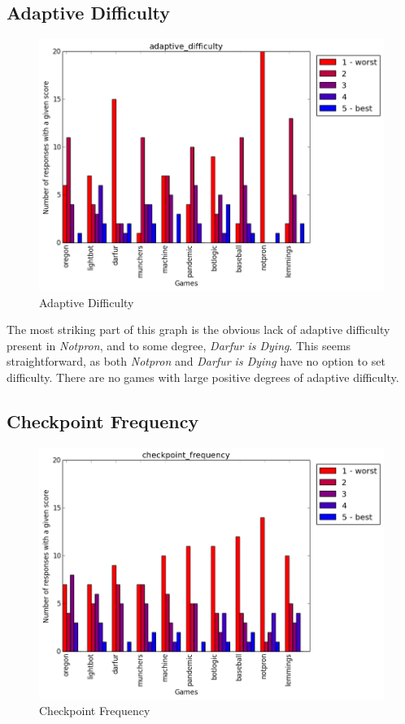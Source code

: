 			\subsection{Adaptive Difficulty}
				\begin{figure}[] 
				\centering 
				\includegraphics[width=\textwidth, height=.4\textheight, keepaspectratio=true]{adaptive_difficulty_scores.png} 
				\caption{Adaptive Difficulty}
				\end{figure}

				The most striking part of this graph is the obvious lack of adaptive difficulty present in \textit{Notpron}, and to some degree, \textit{Darfur is Dying}. This seems straightforward, as both \textit{Notpron} and \textit{Darfur is Dying} have no option to set difficulty. There are no games with large positive degrees of adaptive difficulty.

			\subsection{Checkpoint Frequency}
				\begin{figure}[] 
				\centering 
				\includegraphics[width=\textwidth, height=.4\textheight, keepaspectratio=true]{checkpoint_frequency_scores.png} 
				\caption{Checkpoint Frequency}
				\end{figure}

